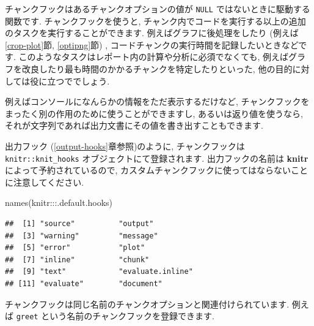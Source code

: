 \documentclass[
  11pt,
  lualatex,
  ja=standard]{bxjsreport}
\newenvironment{Shaded}{\begin{snugshade}}{\end{snugshade}}
\newcommand{\AttributeTok}[1]{\textcolor[rgb]{0.77,0.63,0.00}{#1}}
\newcommand{\ControlFlowTok}[1]{\textcolor[rgb]{0.13,0.29,0.53}{\textbf{#1}}}
\newcommand{\FunctionTok}[1]{\textcolor[rgb]{0.00,0.00,0.00}{#1}}
\newcommand{\NormalTok}[1]{#1}
\newcommand{\SpecialCharTok}[1]{\textcolor[rgb]{0.00,0.00,0.00}{#1}}
\newcommand{\StringTok}[1]{\textcolor[rgb]{0.31,0.60,0.02}{#1}}
\begin{document}
チャンクフックはあるチャンクオプションの値が \texttt{NULL} ではないときに駆動する関数です. チャンクフックを使うと, チャンク内でコードを実行する以上の追加のタスクを実行することができます. 例えばグラフに後処理をしたり (例えば\ref{crop-plot}節, \ref{optipng}節) , コードチャンクの実行時間を記録したいときなどです. このようなタスクはレポート内の計算や分析に必須でなくても, 例えばグラフを改良したり最も時間のかかるチャンクを特定したりといった, 他の目的に対しては役に立つででしょう.

例えばコンソールになんらかの情報をただ表示するだけなど, チャンクフックをまったく別の作用のために使うことができますし, あるいは返り値を使うなら, それが文字列であれば出力文書にその値を書き出すこともできます.

出力フック (\ref{output-hooks}章参照)のように, チャンクフックは \texttt{knitr::knit\_hooks} オブジェクトにて登録されます. 出力フックの名前は \textbf{knitr} によって予約されているので, カスタムチャンクフックに使ってはならないことに注意してください.

\begin{Shaded}
\begin{Highlighting}[numbers=left,,]
\FunctionTok{names}\NormalTok{(knitr}\SpecialCharTok{:::}\NormalTok{.default.hooks)}
\end{Highlighting}
\end{Shaded}

\begin{verbatim}
##  [1] "source"          "output"         
##  [3] "warning"         "message"        
##  [5] "error"           "plot"           
##  [7] "inline"          "chunk"          
##  [9] "text"            "evaluate.inline"
## [11] "evaluate"        "document"
\end{verbatim}

チャンクフックは同じ名前のチャンクオプションと関連付けられています. 例えば \texttt{greet} という名前のチャンクフックを登録できます.

\begin{Shaded}
\end{Shaded}
\end{document}
